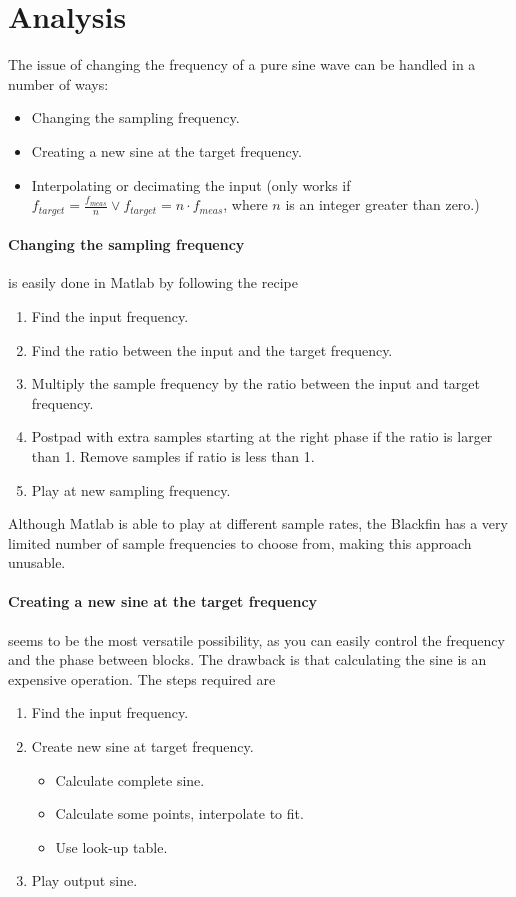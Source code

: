 
\section{Analysis}
The issue of changing the frequency of a pure sine wave can be handled in a number of ways:
\begin{itemize}
	\item Changing the sampling frequency.
	\item Creating a new sine at the target frequency.
	\item Interpolating or decimating the input (only works if $f_{target}=\frac{f_{meas}}{n}\vee f_{target} =n\cdot f_{meas}$, where $n$ is an integer greater than zero.)
\end{itemize}

\paragraph{Changing the sampling frequency} is easily done in Matlab by following the recipe
\begin{enumerate}
	\item Find the input frequency.
	\item Find the ratio between the input and the target frequency.
	\item Multiply the sample frequency by the ratio between the input and target frequency.
	\item Postpad with extra samples starting at the right phase if the ratio is larger than 1. Remove samples if ratio is less than 1.
	\item Play at new sampling frequency.
\end{enumerate}
Although Matlab is able to play at different sample rates, the Blackfin has a very limited number of sample frequencies to choose from, making this approach unusable.

\paragraph{Creating a new sine at the target frequency} seems to be the most versatile possibility, as you can easily control the frequency and the phase between blocks. The drawback is that calculating the sine is an expensive operation. The steps required are
\begin{enumerate}
	\item Find the input frequency.
	\item Create new sine at target frequency.
	\begin{itemize}
		\item Calculate complete sine.
		\item Calculate some points, interpolate to fit.
		\item Use look-up table.
	\end{itemize}
	\item Play output sine.
\end{enumerate}

